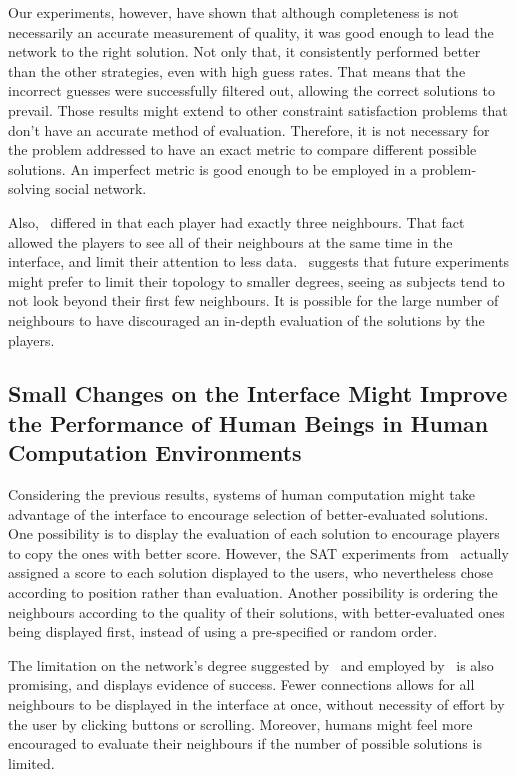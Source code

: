 \documentclass{article}
\begin{document}
Our experiments, however, have shown that although completeness is not necessarily an accurate measurement of quality, it was good enough to lead the network to the right solution. Not only that, it consistently performed better than the other strategies, even with high guess rates.
That means that the incorrect guesses were successfully filtered out, allowing the correct solutions to prevail.
Those results might extend to other constraint satisfaction problems that don't have an accurate method of evaluation. Therefore, it is not necessary for the problem addressed to have an exact metric to compare different possible solutions. An imperfect metric is good enough to be employed in a problem-solving social network. 

Also,~\cite{mason:collablearnet} differed in that each player had exactly three neighbours. That fact allowed the players to see all of their neighbours at the same time in the interface, and limit their attention to less data.~\cite{farenzena:collabem} suggests that future experiments might prefer to limit their topology to smaller degrees, seeing as subjects tend to not look beyond their first few neighbours. It is possible for the large number of neighbours to have discouraged an in-depth evaluation of the solutions by the players.

\subsection{Small Changes on the Interface Might Improve the Performance of Human Beings in Human Computation Environments}

Considering the previous results, systems of human computation might take advantage of the interface to encourage selection of better-evaluated solutions. One possibility is to display the evaluation of each solution to encourage players to copy the ones with better score. However, the SAT experiments from~\cite{farenzena:collabem} actually assigned a score to each solution displayed to the users, who nevertheless chose according to position rather than evaluation. Another possibility is ordering the neighbours according to the quality of their solutions, with better-evaluated ones being displayed first, instead of using a pre-specified or random order.

The limitation on the network's degree suggested by~\cite{farenzena:collabem} and employed by~\cite{mason:collablearnet} is also promising, and displays evidence of success. Fewer connections allows for all neighbours to be displayed in the interface at once, without necessity of effort by the user by clicking buttons or scrolling. Moreover, humans might feel more encouraged to evaluate their neighbours if the number of possible solutions is limited.
%
\end{document}
